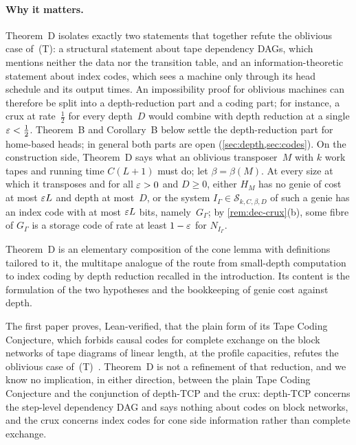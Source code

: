 \paragraph{Why it matters.} Theorem~D isolates exactly two statements that together refute the oblivious case
of~(T): a structural statement about tape dependency DAGs, which mentions neither the data nor the transition table,
and an information-theoretic statement about index codes, which sees a machine only through its head schedule and
its output times. An impossibility proof for oblivious machines can therefore be split into a depth-reduction part
and a coding part; for
instance, a crux at rate~$\tfrac12$ for every depth~$D$ would combine with depth reduction at a single
$\varepsilon<\tfrac12$. Theorem~B and Corollary~B below settle the depth-reduction part for home-based heads; in general
both parts are open (\cref{sec:depth,sec:codes}). On the construction side, Theorem~D says what an oblivious
transposer~$M$ with $k$ work tapes and running time $C(L+1)$ must do; let $\beta=\beta(M)$. At every size at which it
transposes and for all $\varepsilon>0$ and $D\ge0$, either $H_M$ has no genie of cost at most $\varepsilon L$ and depth at
most~$D$, or the system $I_\Gamma\in\mathcal S_{k,C,\beta,D}$ of such a genie has an index code with at most $\varepsilon L$
bits, namely~$G_\Gamma$; by \cref{rem:dec-crux}(b), some fibre of $G_\Gamma$ is a storage code of rate at least
$1-\varepsilon$ for $N_{I_\Gamma}$.

Theorem~D is an elementary composition of the cone lemma with definitions tailored to it, the multitape analogue of
the route from small-depth computation to index coding by depth reduction recalled in the introduction. Its content is
the formulation of the two hypotheses and the bookkeeping of genie cost against depth.

\begin{remark}\label{rem:dec-first}
The first paper proves, Lean-verified, that the plain form of its Tape Coding Conjecture, which forbids causal codes
for complete exchange on the block networks of tape diagrams of linear length, at the profile capacities, refutes the
oblivious case of~(T)~\cite[Theorem~9.9]{FirstPaper2026}. Theorem~D is not a refinement of that reduction, and we know no
implication, in either direction, between the plain Tape Coding Conjecture and the conjunction of depth-TCP and the crux:
depth-TCP concerns the step-level dependency DAG and says nothing about codes on block networks, and the crux
concerns index codes for cone side information rather than complete exchange.
\end{remark}

